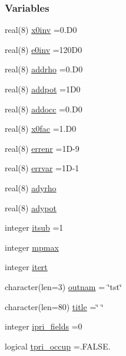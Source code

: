 \subsubsection*{Variables}
\begin{DoxyCompactItemize}
\item 
real(8) \hyperlink{namespacedynpar_a57dd802430450aea66e77f67862b706d}{x0inv} =0.\+D0
\item 
real(8) \hyperlink{namespacedynpar_adb20e834bea1f9c5916b6dcf71117310}{e0inv} =120\+D0
\item 
real(8) \hyperlink{namespacedynpar_a786b46b00f5bc2733ee8a333f402c8b8}{addrho} =0.\+D0
\item 
real(8) \hyperlink{namespacedynpar_a471b6f8327d73d0d3fcfb99a045c4db4}{addpot} =1\+D0
\item 
real(8) \hyperlink{namespacedynpar_a7bce766adffe727e6e87f70e5ef9f56f}{addocc} =0.\+D0
\item 
real(8) \hyperlink{namespacedynpar_ade319b182a5cf3eeb532a266c036e1db}{x0fac} =1.\+D0
\item 
real(8) \hyperlink{namespacedynpar_a18628c991498b8604535ab88dc8d6138}{errenr} =1\+D-\/9
\item 
real(8) \hyperlink{namespacedynpar_a75c0e72e8fdd83bcf086d999389b6842}{errvar} =1\+D-\/1
\item 
real(8) \hyperlink{namespacedynpar_a5df7c9c26d3c19fcaeed23c864679981}{adyrho}
\item 
real(8) \hyperlink{namespacedynpar_acaa0cf6de41c1f3711fb9a20de59e903}{adypot}
\item 
integer \hyperlink{namespacedynpar_abb878319b6c5e1ba747ec88b09fe364f}{itsub} =1
\item 
integer \hyperlink{namespacedynpar_a920d02babff72b0b7d4bc33c4c303c37}{mpmax}
\item 
integer \hyperlink{namespacedynpar_a5d684c8c5595bd94acfef2e7054d5cb8}{itert}
\item 
character(len=3) \hyperlink{namespacedynpar_ae8814a4465f746260e5df076c821cc2c}{outnam} = \char`\"{}tst\char`\"{}
\item 
character(len=80) \hyperlink{namespacedynpar_a8f17285d0a850123850dacf83f3c7ee7}{title} =\char`\"{} \char`\"{}
\item 
integer \hyperlink{namespacedynpar_a75d1d07f7bc1b403e24ec22b7fae69a9}{ipri\+\_\+fields} =0
\item 
logical \hyperlink{namespacedynpar_a2f991da94ce72ea9621829c805eb88c8}{tpri\+\_\+occup} =.F\+A\+L\+S\+E.
\item 

\end{DoxyCompactItemize}
